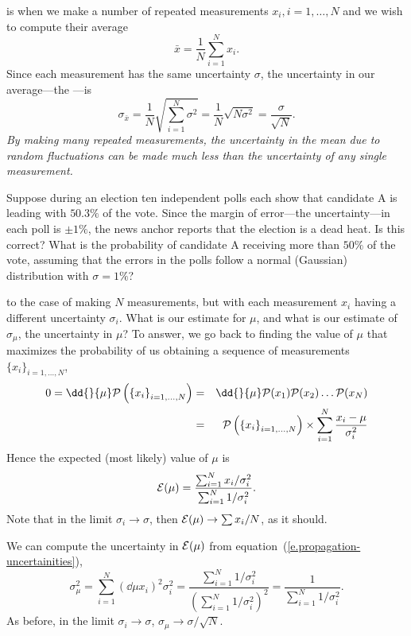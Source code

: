  is when we make a number of repeated measurements $x_{i}, i=1,\ldots,N$ and we wish to compute their average
\[ \bar{x} = \frac{1}{N}\sum_{i=1}^{N}x_{i} . \]
Since each measurement has the same uncertainty $\sigma$, the uncertainty in our average---the ---is
\begin{equation}\label{e.error-mean}
 \sigma_{\bar{x}} = \frac{1}{N}\sqrt{\sum_{i=1}^{N}\sigma^{2}}
 	= \frac{1}{N}\sqrt{N\sigma^{2}}
  = \frac{\sigma}{\sqrt{N}}.
\end{equation}
\emph{By making many repeated measurements, the uncertainty in the mean due to random fluctuations can be made much less than the uncertainty of any single measurement.}

\begin{exercisebox}
Suppose during an election ten independent polls each show that candidate A is leading with $50.3\%$ of the vote. Since the margin of error---the uncertainty---in each poll is $\pm 1\%$, the news anchor reports that the election is a dead heat.  Is this correct?  What is the probability of candidate A receiving more than $50\%$ of the vote, assuming that the errors in the polls follow a normal (Gaussian) distribution with $\sigma = 1\%$?
\end{exercisebox}

 to the case of making $N$ measurements, but with each measurement $x_{i}$ having a different uncertainty $\sigma_{i}$.  What is our estimate for $\mu$, and what is our estimate of $\sigma_{\mu}$, the uncertainty in $\mu$?  To answer, we go back to finding the value of $\mu$ that maximizes the probability of us obtaining a sequence of measurements $\{x_{i}\}_{i=1,\ldots,N}$,
\begin{eqnarray*}
	0 = \dd{}{\mu}\prob\left(\left\{x_{i}\right\}_{i=1,\ldots,N}\right) &=& 
		\dd{}{\mu}\prob(x_{1})\prob(x_{2})\ldots\prob(x_{N})\\
	&=&	\prob\left(\left\{x_{i}\right\}_{i=1,\ldots,N}\right) 
		\times \sum_{i=1}^{N}\frac{x_{i}-\mu}{\sigma_{i}^{2}}
\end{eqnarray*}
Hence the expected (most likely) value of $\mu$ is
\begin{equation}
	\mathcal{E}(\mu) = \frac{\sum_{i=1}^{N} x_{i}/\sigma_{i}^{2}}{\sum_{i=1}^{N} 1/\sigma_{i}^{2}}.
\end{equation}
Note that in the limit $\sigma_{i}\to \sigma$, then $\mathcal{E}(\mu)\to \sum x_{i}/N$, as it should.

We can compute the uncertainty in $\mathcal{E}(\mu)$ 
from equation~(\ref{e.propagation-uncertainities}),
\begin{equation}
	\sigma_{\mu}^{2} = \sum_{i=1}^{N} \left(\dd{\mu}{x_{i}}\right)^{2} \sigma_{i}^{2} = \frac{\sum_{i=1}^{N}1/\sigma_{i}^{2}}{\left(\sum_{i=1}^{N}1/\sigma_{i}^{2}\right)^{2}} = \frac{1}{\sum_{i=1}^{N}1/\sigma_{i}^{2}}.
\end{equation}
As before, in the limit $\sigma_{i}\to\sigma$, $\sigma_{\mu}\to\sigma/\sqrt{N}$.


